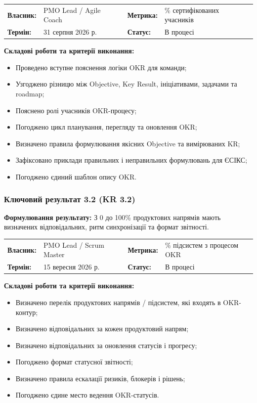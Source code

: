 \documentclass{article}
\begin{document}
\noindent\begin{tabular}{@{}p{2.2cm}p{4.5cm}p{2.2cm}p{4.5cm}@{}}
\toprule
\textbf{Власник:} & PMO Lead / Agile Coach & \textbf{Метрика:} & \% сертифікованих учасників \\
\textbf{Термін:} & 31 серпня 2026 р. & \textbf{Статус:} & В процесі \\
\bottomrule
\end{tabular}

\vspace{10pt}
\textbf{Складові роботи та критерії виконання:}
\begin{itemize}
    \item Проведено вступне пояснення логіки OKR для команди;
    \item Узгоджено різницю між Objective, Key Result, ініціативами, задачами та roadmap;
    \item Пояснено ролі учасників OKR-процесу;
    \item Погоджено цикл планування, перегляду та оновлення OKR;
    \item Визначено правила формулювання якісних Objective та вимірюваних KR;
    \item Зафіксовано приклади правильних і неправильних формулювань для ЄСІКС;
    \item Погоджено єдиний шаблон опису OKR.
\end{itemize}

\subsubsection{Ключовий результат 3.2 (KR 3.2)}

\textbf{Формулювання результату:} З 0 до 100\% продуктових напрямів мають визначених відповідальних, ритм синхронізації та формат звітності.

\noindent\begin{tabular}{@{}p{2.2cm}p{4.5cm}p{2.2cm}p{4.5cm}@{}}
\toprule
\textbf{Власник:} & PMO Lead / Scrum Master & \textbf{Метрика:} & \% підсистем з процесом OKR \\
\textbf{Термін:} & 15 вересня 2026 р. & \textbf{Статус:} & В процесі \\
\bottomrule
\end{tabular}

\vspace{10pt}
\textbf{Складові роботи та критерії виконання:}
\begin{itemize}
    \item Визначено перелік продуктових напрямів / підсистем, які входять в OKR-контур;
    \item Визначено відповідальних за кожен продуктовий напрям;
    \item Визначено відповідальних за оновлення статусів і прогресу;
    \item Погоджено формат статусної звітності;
    \item Визначено правила ескалації ризиків, блокерів і рішень;
    \item Погоджено єдине место ведення OKR-статусів.
\end{itemize}
\end{document}
